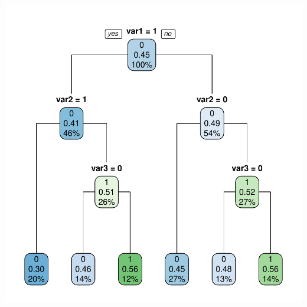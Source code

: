 \documentclass[t,8pt,utfx8]{beamer}
\begin{document}
\begin{spacing}{1.25}
{\begin{minipage}{0.48\textwidth}
    \includegraphics[width=.9\textwidth]{../../graphs/graph_tree_categorical.pdf}
\end{minipage}
}



\end{spacing}
\end{document}

